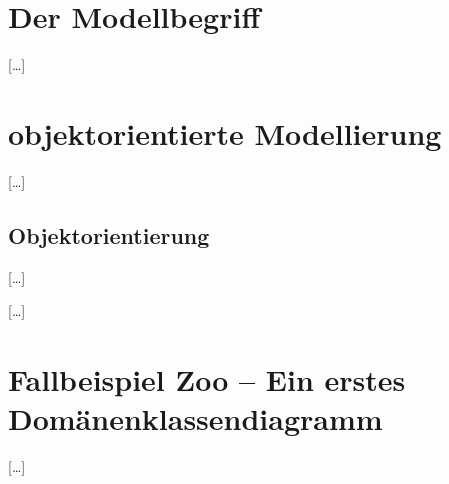 \section{Der Modellbegriff}
\label{sec:Kap-3.1}
[\ldots]

\section{objektorientierte Modellierung}
\label{sec:Kap-3.2}
[\ldots]

\subsection{Objektorientierung}
\label{sec:Kap-3.2.1}
[\ldots]

\setcounter{subsection}{4}
\setcounter{figure}{2}


[\ldots]

\section{Fallbeispiel Zoo – Ein erstes Domänenklassendiagramm}
\label{sec:Kap-3.3}
[\ldots]

%
%
%	
%	

%
%
%	
%	

%
%
%	
%	

